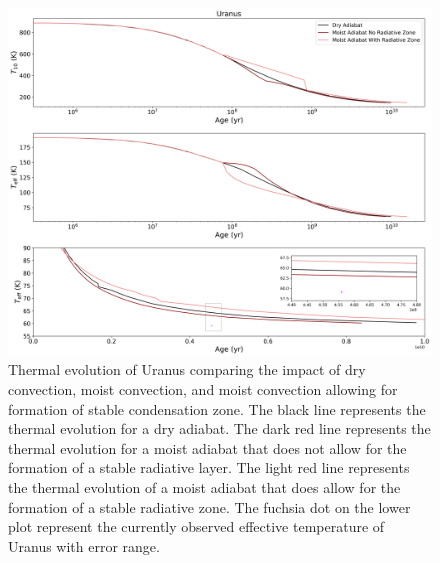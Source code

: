 \documentclass[11pt]{ucscthesisbs}
\begin{document}
\begin{figure}[ht]
 \centerline{
  \includegraphics[scale=0.5]{figures/dry_moist_radiative_u_cooling_curves_adiabat_comparisons.png}
 }
\caption[Thermal Evolution Curves for Uranus - Adiabat Comparisons]
{Thermal evolution of Uranus comparing the impact of dry convection, moist convection, and moist convection allowing for formation of stable condensation zone. The black line represents the thermal evolution for a dry adiabat. The dark red line represents the thermal evolution for a moist adiabat that does not allow for the formation of a stable radiative layer. The light red line represents the thermal evolution of a moist adiabat that does allow for the formation of a stable radiative zone. The fuchsia dot on the lower plot represent the currently observed effective temperature of Uranus with error range. }
\label{fig:evolve_adiabats}
\end{figure}
\end{document}
